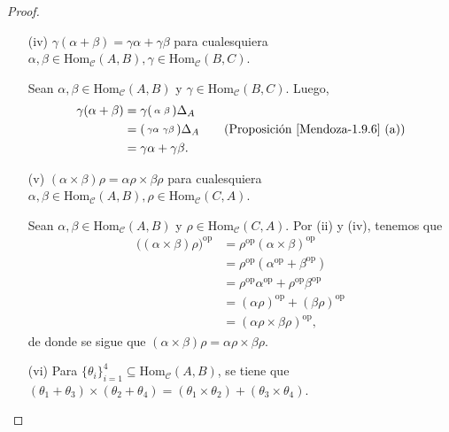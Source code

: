 \documentclass[tesis]{subfiles}
\begin{document}
\begin{proof}
\begin{itemize}
        \item[(iv)] $\gamma(\alpha+\beta)=\gamma\alpha+\gamma\beta$ para cualesquiera $\alpha,\beta\in\text{Hom}_\mathscr{C}(A,B), \gamma\in\text{Hom}_\mathscr{C}(B,C)$.

            Sean $\alpha,\beta\in\text{Hom}_\mathscr{C}(A,B)$ y $\gamma\in\text{Hom}_\mathscr{C}(B,C)$. Luego,
            \begin{align*}
                \gamma(\alpha+\beta) &= \gamma(\begin{smallmatrix} \alpha &\beta \end{smallmatrix})\Delta_A \\
                                     &= ( \begin{smallmatrix} \gamma\alpha &\gamma\beta \end{smallmatrix}) \Delta_A \tag{Proposición \ref{Mendoza-1.9.6} (a)} \\
                                     &= \gamma\alpha+\gamma\beta.
            \end{align*}

        \item[(v)] $(\alpha\times\beta)\rho = \alpha\rho\times\beta\rho$ para cualesquiera $\alpha,\beta\in\text{Hom}_\mathscr{C}(A,B), \rho\in\text{Hom}_\mathscr{C}(C,A)$.

            Sean $\alpha,\beta\in\text{Hom}_\mathscr{C}(A,B)$ y $\rho\in\text{Hom}_\mathscr{C}(C,A)$. Por (ii) y (iv), tenemos que
            \begin{align*}
                \big((\alpha\times\beta)\rho\big)^{\text{op}} &= \rho^{\text{op}}(\alpha\times\beta)^{\text{op}} \\
                                                              &= \rho^{\text{op}}(\alpha^{\text{op}}+\beta^{\text{op}}) \\
                                                              &= \rho^{\text{op}}\alpha^{\text{op}}+\rho^{\text{op}}\beta^{\text{op}} \\
                                                              &= (\alpha\rho)^{\text{op}} + (\beta\rho)^{\text{op}} \\
                                                              &= (\alpha\rho\times\beta\rho)^{\text{op}},
            \end{align*}
            de donde se sigue que $(\alpha\times\beta)\rho=\alpha\rho\times\beta\rho$.

        \item[(vi)] Para $\{\theta_i\}_{i=1}^4\subseteq\text{Hom}_\mathscr{C}(A,B)$, se tiene que $(\theta_1+\theta_3)\times(\theta_2+\theta_4) = (\theta_1\times\theta_2)+(\theta_3\times\theta_4)$.


\end{itemize}
\end{proof}
\end{document}
